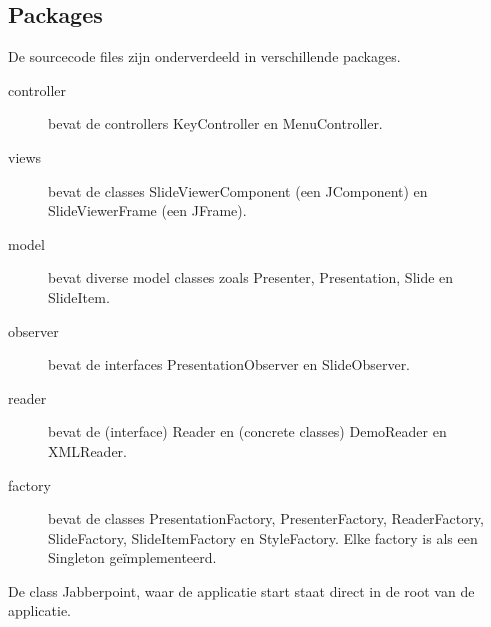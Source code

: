 \documentclass[a4paper]{article}
\begin{document}
\subsection{Packages}
De sourcecode files zijn onderverdeeld in verschillende packages.
\begin{description}
\item[controller] bevat de controllers KeyController en MenuController.
\item[views] bevat de classes SlideViewerComponent (een JComponent) en SlideViewerFrame (een JFrame).
\item[model] bevat diverse model classes zoals Presenter, Presentation, Slide en SlideItem.
\item[observer] bevat de interfaces PresentationObserver en SlideObserver.
\item[reader] bevat de (interface) Reader en (concrete classes) DemoReader en XMLReader.
\item[factory] bevat de classes PresentationFactory, PresenterFactory, ReaderFactory, SlideFactory, SlideItemFactory en StyleFactory. Elke factory is als een Singleton geïmplementeerd.
\end{description}
De class Jabberpoint, waar de applicatie start staat direct in de root van de applicatie.
\end{document}
